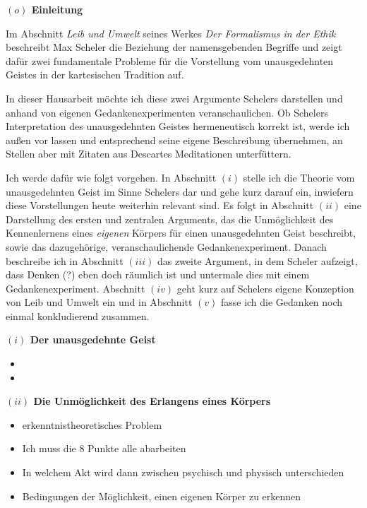 \documentclass[a4paper, 12pt]{article}
\begin{document}
\begin{onehalfspace} 

\noindent\textbf{$(o)$ Einleitung}

\noindent Im Abschnitt \emph{Leib und Umwelt} seines Werkes \emph{Der Formalismus in der Ethik} beschreibt Max Scheler die Beziehung der namensgebenden Begriffe und zeigt dafür zwei fundamentale Probleme für die Vorstellung vom unausgedehnten Geistes in der kartesischen Tradition auf.%

In dieser Hausarbeit möchte ich diese zwei Argumente Schelers darstellen und anhand von eigenen Gedankenexperimenten veranschaulichen. Ob Schelers Interpretation des unausgedehnten Geistes hermeneutisch korrekt ist, werde ich außen vor lassen und entsprechend seine eigene Beschreibung übernehmen, an Stellen aber mit Zitaten aus Descartes Meditationen unterfüttern. 

Ich werde dafür wie folgt vorgehen. In Abschnitt $(i)$ stelle ich die Theorie vom unausgedehnten Geist im Sinne Schelers dar und gehe kurz darauf ein, inwiefern diese Vorstellungen heute weiterhin relevant sind. Es folgt in Abschnitt $(ii)$ eine Darstellung des ersten und zentralen Arguments, das die Unmöglichkeit des Kennenlernens eines \emph{eigenen} Körpers für einen unausgedehnten Geist beschreibt, sowie das dazugehörige, veranschaulichende Gedankenexperiment. Danach beschreibe ich in Abschnitt $(iii)$ das zweite Argument, in dem Scheler aufzeigt, dass Denken (?) eben doch räumlich ist und untermale dies mit einem Gedankenexperiment. Abschnitt $(iv)$ geht kurz auf Schelers eigene Konzeption von Leib und Umwelt ein und in Abschnitt $(v)$ fasse ich die Gedanken noch einmal konkludierend zusammen.

\vspace{5mm}
\noindent\textbf{$(i)$ Der unausgedehnte Geist}

\begin{itemize}
  \item 
  \item 
\end{itemize}


\vspace{5mm}
\noindent\textbf{$(ii)$ Die Unmöglichkeit des Erlangens eines Körpers}

\begin{itemize}
  \item erkenntnistheoretisches Problem
  \item Ich muss die 8 Punkte alle abarbeiten
  \item In welchem Akt wird dann zwischen psychisch und physisch unterschieden
  \item Bedingungen der Möglichkeit, einen eigenen Körper zu erkennen
\end{itemize}


\end{onehalfspace}
\end{document}
